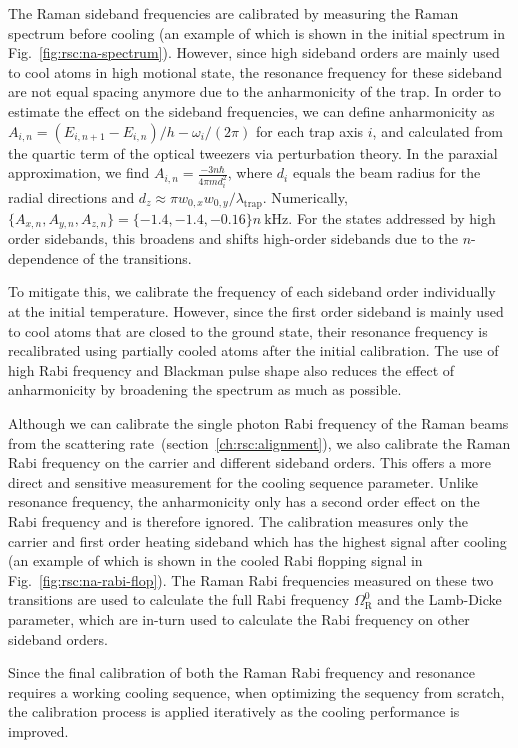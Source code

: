 The Raman sideband frequencies are calibrated by measuring the Raman spectrum before cooling
(an example of which is shown in the initial spectrum in Fig.~\ref{fig:rsc:na-spectrum}).
However, since high sideband orders are mainly used to cool atoms in high motional state,
the resonance frequency for these sideband are not equal spacing anymore due to
the anharmonicity of the trap.
In order to estimate the effect on the sideband frequencies,
we can define anharmonicity as $A_{i,n}=(E_{i,n+1}-E_{i,n})/h - \omega_i/(2\pi)$
for each trap axis $i$, and calculated from the quartic term
of the optical tweezers via perturbation theory.
In the paraxial approximation, we find $A_{i,n}=\frac{-3n\hbar}{4\pi m d_i^2}$,
where $d_i$ equals the beam radius for the radial directions and
$d_z\approx\pi w_{0,x}w_{0,y}/\lambda_{\textrm{trap}}$.
Numerically, $\{A_{x,n},A_{y,n},A_{z,n}\}=\{-1.4, -1.4, -0.16\}n~\mathrm{kHz}$.
For the states addressed by high order sidebands,
this broadens and shifts high-order sidebands
due to the $n$-dependence of the transitions.

To mitigate this, we calibrate the frequency of each sideband order individually
at the initial temperature. However, since the first order sideband is mainly used to cool atoms
that are closed to the ground state,
their resonance frequency  is recalibrated using partially cooled atoms after the initial calibration.
The use of high Rabi frequency and Blackman pulse shape also reduces the effect
of anharmonicity by broadening the spectrum as much as possible.

Although we can calibrate the single photon Rabi frequency of the Raman beams from
the scattering rate~(section~\ref{ch:rsc:alignment}),
we also calibrate the Raman Rabi frequency on the carrier and different sideband orders.
This offers a more direct and sensitive measurement for the cooling sequence parameter.
Unlike resonance frequency, the anharmonicity only has a second order effect on the Rabi frequency
and is therefore ignored. The calibration measures
only the carrier and first order heating sideband which has the highest signal after cooling
(an example of which is shown in the cooled Rabi flopping signal in
Fig.~\ref{fig:rsc:na-rabi-flop}).
The Raman Rabi frequencies measured on these two transitions are used to calculate
the full Rabi frequency $\Omega_{\mathrm{R}}^0$ and the Lamb-Dicke parameter,
which are in-turn used to calculate the Rabi frequency on other sideband orders.

Since the final calibration of both the Raman Rabi frequency and resonance requires a working
cooling sequence, when optimizing the sequency from scratch,
the calibration process is applied iteratively as the cooling performance is improved.

